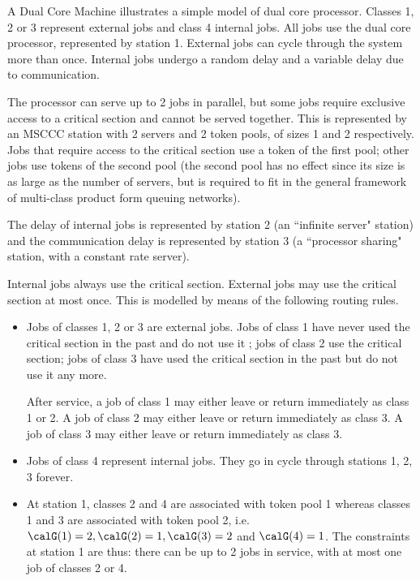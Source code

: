 \begin{ex}{A Dual Core
Machine} illustrates a simple
model of dual core processor. Classes 1, 2 or 3
represent external jobs and class 4 internal
jobs. All jobs use the dual core processor,
represented by station 1. External jobs can cycle
through the system more than once. Internal jobs
undergo a random delay  and a variable delay due
to communication.

The processor can serve up to 2 jobs in parallel,
but some jobs require exclusive access to a
critical section and cannot be served together.
This is represented by an MSCCC station with 2
servers and 2 token pools, of sizes 1 and 2
respectively. Jobs that require access to the
critical section use a token of the first pool;
other jobs use tokens of the second pool (the
second pool has no effect since its size is as
large as the number of servers, but is required
to fit in the general framework of multi-class
product form queuing networks).

The delay of internal jobs is represented by
station 2 (an ``infinite server" station) and the
communication delay is represented by station 3
(a ``processor sharing" station, with a constant
rate server).

Internal jobs always use the critical section.
External jobs may use the critical section at
most once. This is modelled by means of the
following routing rules.
\begin{itemize}
    \item Jobs of classes 1, 2 or 3 are external
    jobs. Jobs of class 1 have never used the
    critical section in the past and do not use it ; jobs of class 2
    use the critical section; jobs of class 3
    have used the critical section in the past
    but do not use it any more.

    After service, a job of class 1
    may either leave or return immediately as class 1 or 2. A job of
    class 2 may either leave or return immediately as class 3. A
    job of class 3 may either leave or return immediately as class
    3.

    \item Jobs of class 4 represent internal jobs. They go
        in cycle through stations 1, 2, 3 forever.

    \item At station 1, classes 2 and 4 are
    associated with token pool 1 whereas classes 1
    and 3 are associated with token pool 2, i.e. $\calG(1)=2, \calG(2)=1, \calG(3)=2$ and
    $\calG(4)=1$. The constraints at station 1 are thus: there can be up to 2 jobs in
    service, with at most one job of classes 2 or
    4.
\end{itemize}


\end{ex}
